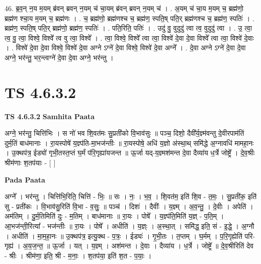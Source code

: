 \documentclass[17pt]{extarticle}
\begin{document}
46. ब्र॒व॒न् न॒य म॒यम् ब्र॑वन् ब्रवन् न॒यम् च॑ चा॒यम् ब्र॑वन् ब्रवन् न॒यम् च॑ । . अ॒यम् च॑ चा॒य म॒यम् च॒ ब्रह्म॑णो॒ ब्रह्म॑ण श्चा॒य म॒यम् च॒ ब्रह्म॑णः । . च॒ ब्रह्म॑णो॒ ब्रह्म॑णश्च च॒ ब्रह्म॑ण॒ स्पति॒ष् पति॒र् ब्रह्म॑णश्च च॒ ब्रह्म॑ण॒ स्पतिः॑ । . ब्रह्म॑ण॒ स्पति॒ष् पति॒र् ब्रह्म॑णो॒ ब्रह्म॑ण॒ स्पतिः॑ । . पति॒रिति॒ पतिः॑ । . उदु॑ वु॒ वुदुदु॑ त्वा त्व॒ वुदुदु॑ त्वा । . उ॒ त्वा॒ त्व॒ वु॒ त्वा॒ विश्वे॒ विश्वे᳚ त्व वु त्वा॒ विश्वे᳚ । . त्वा॒ विश्वे॒ विश्वे᳚ त्वा त्वा॒ विश्वे॑ दे॒वा दे॒वा विश्वे᳚ त्वा त्वा॒ विश्वे॑ दे॒वाः । . विश्वे॑ दे॒वा दे॒वा विश्वे॒ विश्वे॑ दे॒वा अग्ने ऽग्ने॑ दे॒वा विश्वे॒ विश्वे॑ दे॒वा अग्ने᳚ । . दे॒वा अग्ने ऽग्ने॑ दे॒वा दे॒वा अग्ने॒ भर॑न्तु॒ भर॒न्त्वग्ने॑ दे॒वा दे॒वा अग्ने॒ भर॑न्तु । \newline
\pagebreak
{}

\section{ TS 4.6.3.2 }

\textbf{TS 4.6.3.2 } \newline
\textbf{Samhita Paata} \newline

अग्ने॒ भर॑न्तु॒ चित्ति॑भिः । स नो॑ भव शि॒वत॑मः सु॒प्रती॑को वि॒भाव॑सुः ॥ पञ्च॒ दिशो॒ दैवी᳚र्य॒ज्ञ्म॑वन्तु दे॒वीरपाम॑तिं दुर्म॒तिं बाध॑मानाः । रा॒यस्पोषे॑ य॒ज्ञ्प॑ति-मा॒भज॑न्तीः ॥ रा॒यस्पोषे॒ अधि॑ य॒ज्ञो अ॑स्था॒थ् समि॑द्धे अ॒ग्नावधि॑ मामहा॒नः । उ॒क्थप॑त्र॒ ईड्यो॑ गृभी॒तस्त॒प्तं घ॒र्मं प॑रि॒गृह्या॑यजन्त ॥ ऊ॒र्जा यद्-य॒ज्ञ्मश॑मन्त दे॒वा दैव्या॑य ध॒र्त्रे जोष्ट्रे᳚ । दे॒व॒श्रीः श्रीम॑णाः श॒तप॑याः - [  ] \newline

\textbf{Pada Paata} \newline

अग्ने᳚ । भर॑न्तु । चित्ति॑भि॒रिति॒ चित्ति॑ - भिः॒ ॥ सः । नः॒ । भ॒व॒ । शि॒वत॑म॒ इति॑ शि॒व - त॒मः॒ । सु॒प्रती॑क॒ इति॑ सु - प्रती॑कः । वि॒भाव॑सु॒रिति॑ वि॒भा - व॒सुः॒ ॥ पञ्च॑ । दिशः॑ । दैवीः᳚ । य॒ज्ञ्म् । अ॒व॒न्तु॒ । दे॒वीः । अपेति॑ । अम॑तिम् । दु॒र्म॒तिमिति॑ दुः - म॒तिम् । बाध॑मानाः ॥ रा॒यः । पोषे᳚ । य॒ज्ञ्प॑ति॒मिति॑ य॒ज्ञ् - प॒ति॒म् । आ॒भज॑न्ती॒रित्या᳚ - भज॑न्तीः ॥ रा॒यः । पोषे᳚ । अधीति॑ । य॒ज्ञ्ः । अ॒स्था॒त् । समि॑द्ध॒ इति॒ सं - इ॒द्धे॒ । अ॒ग्नौ । अधीति॑ । मा॒म॒हा॒नः ॥ उ॒क्थप॑त्र॒ इत्यु॒क्थ - प॒त्रः॒ । ईड्यः॑ । गृ॒भी॒तः । त॒प्तम् । घ॒र्मम् । प॒रि॒गृह्येति॑ परि-गृह्य॑ । अ॒य॒ज॒न्त॒ ॥ ऊ॒र्जा । यत् । य॒ज्ञ्म् । अश॑मन्त । दे॒वाः । दैव्या॑य । ध॒र्त्रे । जोष्ट्रे᳚ ॥ दे॒व॒श्रीरिति॑ देव - श्रीः । श्रीम॑णा॒ इति॒ श्री - म॒नाः॒ । श॒तप॑या॒ इति॑ श॒त - प॒याः॒ ।  \newline
\end{document}
